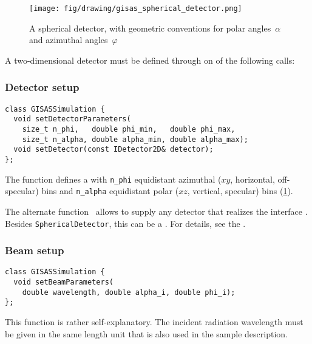 \begin{figure}[tb]
\begin{center}
\texttt{[image: fig/drawing/gisas\_spherical\_detector.png]}
\end{center}
\caption{A spherical detector, with geometric conventions for polar angles~$\alpha$
and azimuthal angles~$\varphi$}
\label{FDetSpher}
\end{figure}

A two-dimensional detector must be defined through on of the following calls:

\subsubsection{Detector setup}\label{SRefDet}
\begin{lstlisting}
class GISASSimulation {
  void setDetectorParameters(
    size_t n_phi,   double phi_min,   double phi_max,
    size_t n_alpha, double alpha_min, double alpha_max);
  void setDetector(const IDetector2D& detector);
};
\end{lstlisting}
The function 
defines a 
%
with \texttt{n\_phi} equidistant azimuthal ($xy$, horizontal, off-specular) bins
%
%
%
%
and  \texttt{n\_alpha} equidistant polar ($xz$, vertical, specular) bins (\cref{FDetSpher}).
%
%
%
%

The alternate function~
allows to supply any detector that realizes the interface .
Besides \texttt{SphericalDetector}, this can be a .
For details, see the .

\subsubsection{Beam setup}\label{SRefBeam}
\begin{lstlisting}
class GISASSimulation {
  void setBeamParameters(
    double wavelength, double alpha_i, double phi_i);
};
\end{lstlisting}
This function
is rather self-explanatory.
The incident radiation wavelength must be given in the same length unit
that is also used in the sample description.

